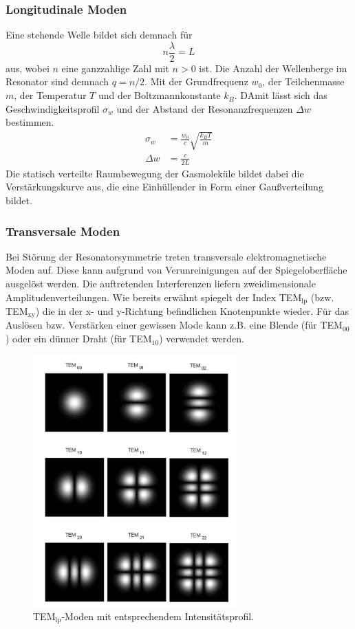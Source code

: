 \subsubsection{Longitudinale Moden}
Eine stehende Welle bildet sich demnach für
\begin{equation}
    n\frac{\lambda}{2}=L
\end{equation}
aus, wobei $n$ eine ganzzahlige Zahl mit $n>0$ ist. Die Anzahl der Wellenberge im Resonator sind demnach $q=n/2$.
Mit der Grundfrequenz $w_0$, der Teilchenmasse $m$, der Temperatur $T$ und der Boltzmannkonstante $k_B$. DAmit lässt sich das Geschwindigkeitsprofil $\sigma_w$
und der Abstand der Resonanzfrequenzen $\Delta w$ bestimmen.
\begin{align}
    \sigma_w&=\frac{w_0}{c}\sqrt{\frac{k_B T}{m}}\\
    \Delta w &=\frac{c}{2L}
\end{align}
Die statisch verteilte Raumbewegung der Gasmoleküle bildet dabei die Verstärkungskurve aus, die eine Einhüllender in Form einer Gaußverteilung bildet.
\subsubsection{Transversale Moden}
Bei Störung der Resonatorsymmetrie treten transversale elektromagnetische Moden auf. Diese kann aufgrund von Verunreinigungen auf
der Spiegeloberfläche ausgelöst werden. Die auftretenden Interferenzen liefern zweidimensionale Amplitudenverteilungen.
Wie bereits erwähnt spiegelt der Index TEM$_{\text{lp}}$ (bzw. TEM$_{\text{xy}}$) die in der x- und y-Richtung befindlichen Knotenpunkte wieder.
Für das Auslösen bzw. Verstärken einer gewissen Mode kann z.B. eine Blende (für TEM$_{00}$) oder ein dünner Draht (für TEM$_{10}$) verwendet werden.
\begin{figure}
    \center
    \includegraphics[width=0.7\textwidth]{bilder/moden.jpg}
    \caption{TEM$_{\text{lp}}$-Moden mit entsprechendem Intensitätsprofil.\cite{wiki}}
\end{figure}